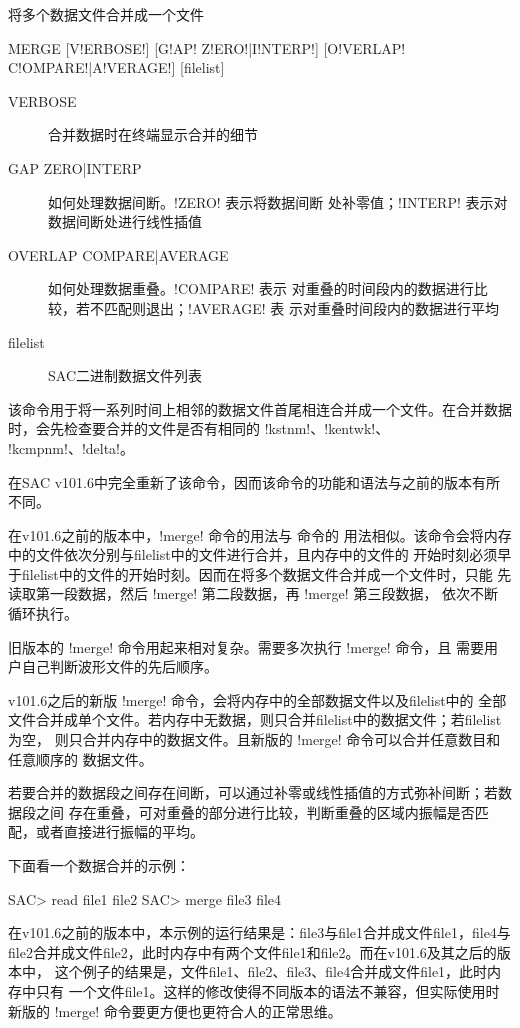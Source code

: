 \label{cmd:merge}

将多个数据文件合并成一个文件

\begin{SACSTX}
MERGE [V!ERBOSE!] [G!AP! Z!ERO!|I!NTERP!] [O!VERLAP! C!OMPARE!|A!VERAGE!] [filelist]
\end{SACSTX}

\begin{description}
\item [VERBOSE] 合并数据时在终端显示合并的细节
\item [GAP ZERO|INTERP] 如何处理数据间断。!ZERO! 表示将数据间断
    处补零值；!INTERP! 表示对数据间断处进行线性插值
\item [OVERLAP COMPARE|AVERAGE] 如何处理数据重叠。!COMPARE! 表示
    对重叠的时间段内的数据进行比较，若不匹配则退出；!AVERAGE! 表
    示对重叠时间段内的数据进行平均
\item [filelist] SAC二进制数据文件列表
\end{description}

该命令用于将一系列时间上相邻的数据文件首尾相连合并成一个文件。在合并数据
时，会先检查要合并的文件是否有相同的 !kstnm!、!kentwk!、
!kcmpnm!、!delta!。

在SAC v101.6中完全重新了该命令，因而该命令的功能和语法与之前的版本有所
不同。

在v101.6之前的版本中，!merge! 命令的用法与  命令的
用法相似。该命令会将内存中的文件依次分别与filelist中的文件进行合并，且内存中的文件的
开始时刻必须早于filelist中的文件的开始时刻。因而在将多个数据文件合并成一个文件时，只能
先读取第一段数据，然后 !merge! 第二段数据，再 !merge! 第三段数据，
依次不断循环执行。

旧版本的 !merge! 命令用起来相对复杂。需要多次执行 !merge! 命令，且
需要用户自己判断波形文件的先后顺序。

v101.6之后的新版 !merge! 命令，会将内存中的全部数据文件以及filelist中的
全部文件合并成单个文件。若内存中无数据，则只合并filelist中的数据文件；若filelist为空，
则只合并内存中的数据文件。且新版的 !merge! 命令可以合并任意数目和任意顺序的
数据文件。

若要合并的数据段之间存在间断，可以通过补零或线性插值的方式弥补间断；若数据段之间
存在重叠，可对重叠的部分进行比较，判断重叠的区域内振幅是否匹配，或者直接进行振幅的平均。

下面看一个数据合并的示例：
\begin{SACCode}
SAC> read file1 file2
SAC> merge file3 file4
\end{SACCode}
在v101.6之前的版本中，本示例的运行结果是：file3与file1合并成文件file1，file4与
file2合并成文件file2，此时内存中有两个文件file1和file2。而在v101.6及其之后的版本中，
这个例子的结果是，文件file1、file2、file3、file4合并成文件file1，此时内存中只有
一个文件file1。这样的修改使得不同版本的语法不兼容，但实际使用时新版的 !merge!
命令要更方便也更符合人的正常思维。

